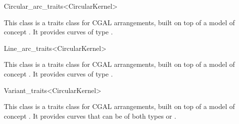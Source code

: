 \begin{ccRefClass}{Circular_arc_traits<CircularKernel>}

\ccDefinition

This class is a traits class for CGAL arrangements, built on top of a model of 
concept .
It provides curves of type .

\ccIsModel
{}

\end{ccRefClass}
\begin{ccRefClass}{Line_arc_traits<CircularKernel>}

\ccDefinition

This class is a traits class for CGAL arrangements, built on top of  a model of 
concept . 
It provides curves of type . 

\ccIsModel
{}

\end{ccRefClass}
\begin{ccRefClass}{Variant_traits<CircularKernel>}

\ccDefinition

This class is a traits class for CGAL arrangements, built on top of  a model of 
concept . 
It provides curves that can be of both types 
 or 
.

\ccIsModel
{}

\end{ccRefClass}
